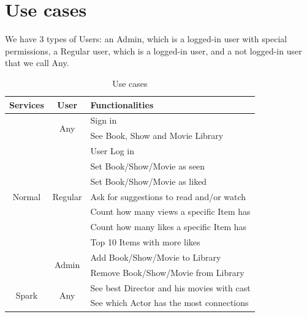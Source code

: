 \documentclass{article}
\newcommand*\fpar{\hspace{1ex}}
\begin{document}
\section{Use cases}
\label{sec:cases}
\fpar We have 3 types of Users: an Admin, which is a logged-in user with special permissions, a Regular user, which is a logged-in user, and a not logged-in user that we call Any.
\begin{table}[H]
  \centering
  \begin{tabular}{c|c|l} 
    Services & User & Functionalities \\ \hline
    \multirow{11}{*}{ Normal }
      & \multirow{2}{*}{ Any } 
        & Sign in \\
      & & See Book, Show and Movie Library \\ \cline{2-3}
      & \multirow{7}{*}{ Regular } 
        & User Log in \\
      & & Set Book/Show/Movie as seen \\
      & & Set Book/Show/Movie as liked \\ 
      & & Ask for suggestions to read and/or watch \\ 
      & & Count how many views a specific Item has \\
      & & Count how many likes a specific Item has \\
      & & Top 10 Items with more likes \\ \cline{2-3}
    & \multirow{2}{*}{ Admin } 
        & Add Book/Show/Movie to Library \\
      & & Remove Book/Show/Movie from Library \\ \hline
    \multirow{2}{*}{ Spark }
      & \multirow{2}{*}{ Any }
        & See best Director and his movies with cast \\
      & & See which Actor has the most connections \\
  \end{tabular}
  \caption{Use cases}
\end{table}
\end{document}
